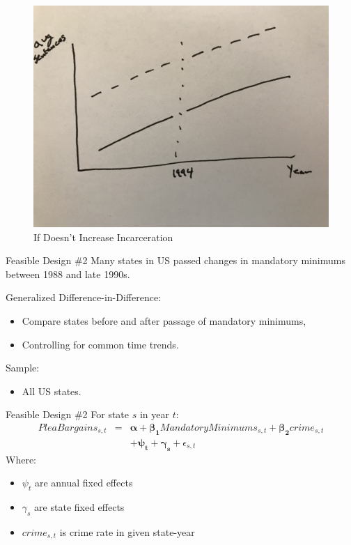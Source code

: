 \documentclass[11pt]{beamer}
\begin{document}
\begin{frame}[c]{}

\begin{figure}
    \centering
    \caption{If Doesn't Increase Incarceration}\label{}
\includegraphics[width=\textwidth]{no_effect.jpg}
\end{figure}

\end{frame}


\begin{frame}[c]{Feasible Design \#2}
Many states in US passed changes in mandatory minimums between 1988 and late 1990s.
\pause \vspace{0.5cm}

Generalized Difference-in-Difference:
\begin{itemize}
    \item Compare states before and after passage of mandatory minimums,
    \item Controlling for common time trends.
\end{itemize}
Sample:
\begin{itemize}
    \item All US states.
\end{itemize}
\end{frame}


\begin{frame}[c]{Feasible Design \#2}
For state $s$ in year $t$:
\begin{eqnarray}
    PleaBargains_{s,t} &=& \boldsymbol{\alpha} + \boldsymbol{\beta_1} MandatoryMinimums_{s,t} + \boldsymbol{\beta_2} crime_{s,t} \nonumber \\
    && + \boldsymbol{\psi_{t}} + \boldsymbol{\gamma_{s}} + \epsilon_{s,t} \nonumber
\end{eqnarray}
Where:
\begin{itemize}
    \item $\psi_{t}$ are annual fixed effects
    \item $\gamma_{s}$ are state fixed effects
    \item $crime_{s,t}$ is crime rate in given state-year
\end{itemize}
\end{frame}
\end{document}
